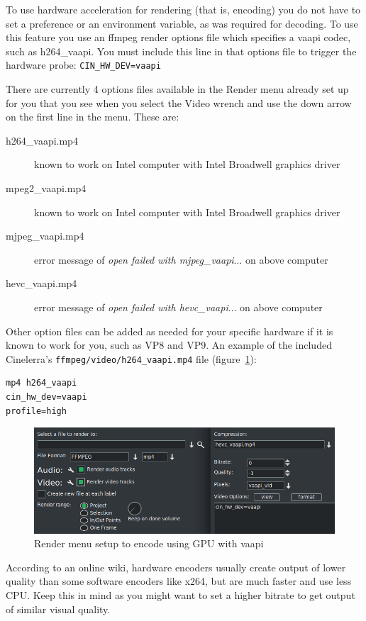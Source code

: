 To use hardware acceleration for rendering (that is, encoding) you do not have to set a preference or an environment variable, as was required for decoding.  To use this feature you use an ffmpeg render options file which specifies a vaapi codec, such as h264\_vaapi.  You must include this line in that options file to trigger the hardware probe: \qquad	\texttt{CIN\_HW\_DEV=vaapi}

There are currently 4 options files available in the Render menu already set up for you that you see when you select the Video wrench and use the down arrow on the first line in the menu.  These are:

\begin{description}
	\item[h264\_vaapi.mp4] known to work on Intel computer with Intel Broadwell graphics driver
	\item[mpeg2\_vaapi.mp4] known to work on Intel computer with Intel Broadwell graphics driver
	\item[mjpeg\_vaapi.mp4] error message of \textit{open failed with mjpeg\_vaapi$\dots$} on above computer
	\item[hevc\_vaapi.mp4] error message of \textit{open failed with hevc\_vaapi$\dots$} on above computer
\end{description}
Other option files can be added as needed for your specific hardware if it is known to work for you, such as VP8 and VP9.  An example of the included Cinelerra’s \texttt{ffmpeg/video/h264\_vaapi.mp4} file (figure~\ref{fig:render-vaapi}):


\begin{lstlisting}[numbers=none]
mp4 h264_vaapi
cin_hw_dev=vaapi
profile=high
\end{lstlisting}

\begin{figure}[htpb]
	\centering
	\includegraphics[width=0.7\linewidth]{images/render-vaapi.png}
	\caption{Render menu setup to encode using GPU with vaapi}
	\label{fig:render-vaapi}
\end{figure}

According to an online wiki, hardware encoders usually create output of lower quality than some software encoders like x264, but are much faster and use less CPU. Keep this in mind as you might want to set a higher bitrate to get output of similar visual quality.

